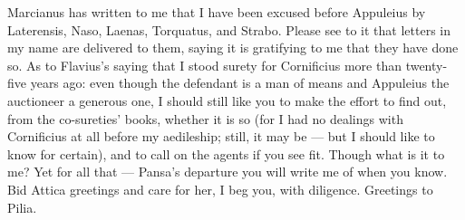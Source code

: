

 Marcianus has written to me that I have been excused before Appuleius by Laterensis, Naso, Laenas, Torquatus, and Strabo. Please see to it that letters in my name are delivered to them, saying it is gratifying to me that they have done so. As to Flavius's saying that I stood surety for Cornificius more than twenty-five years ago: even though the defendant is a man of means and Appuleius the auctioneer a generous one, I should still like you to make the effort to find out, from the co-sureties' books, whether it is so (for I had no dealings with Cornificius at all before my aedileship; still, it may be --- but I should like to know for certain), and to call on the agents if you see fit. Though what is it to me? Yet for all that --- Pansa's departure you will write me of when you know. Bid Attica greetings and care for her, I beg you, with diligence. Greetings to Pilia.
